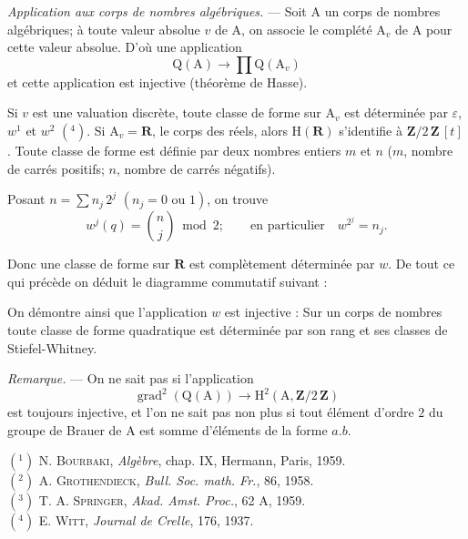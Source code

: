 \emph{Application aux corps de nombres algébriques.} --- Soit $\mathrm A$ un corps de nombres algébriques; à toute valeur absolue $v$ de $\mathrm A$, on associe le complété $\mathrm A_{v}$ de $\mathrm A$ pour cette valeur absolue. D'où une application
\[
\mathrm Q(\mathrm A)\to\prod\mathrm Q(\mathrm A_{v})
\]
et cette application est injective (théorème de Hasse).

Si $v$ est une valuation discrète, toute classe de forme sur $\mathrm A_{v}$ est déterminée par $\varepsilon$, $w^{1}$ et $w^{2}$ $(^{4})$. Si $\mathrm A_{v}=\mathbf R$, le corps des réels, alors $\mathrm H(\mathbf R)$ s'identifie à $\mathbf Z/2\,\mathbf Z\,[t]$. Toute classe de forme est définie par deux nombres entiers $m$ et $n$ ($m$, nombre de carrés positifs; $n$, nombre de carrés négatifs).

Posant $n=\displaystyle\sum n_{j}\,2^{j}$ $(n_{j}=0\text{ ou }1)$, on trouve
\[
w^{j}(q)=\binom{n}{j}\bmod 2;\qquad
\text{en particulier}\quad w^{2^{j}}=n_{j}.
\]

Donc une classe de forme sur $\mathbf R$ est complètement déterminée par $w$. De tout ce qui précède on déduit le diagramme commutatif suivant :

On démontre ainsi que l'application $w$ est injective : Sur un corps de nombres toute classe de forme quadratique est déterminée par son rang et ses classes de Stiefel-Whitney.

\emph{Remarque.} --- On ne sait pas si l'application
\[
\operatorname{grad}^{2}(\mathrm Q(\mathrm A))\to\mathrm H^{2}(\mathrm A,\mathbf Z/2\,\mathbf Z)
\]
est toujours injective, et l'on ne sait pas non plus si tout élément d'ordre $2$ du groupe de Brauer de $\mathrm A$ est somme d'éléments de la forme $a.b$.

{\small
$(^{1})$ N. \textsc{Bourbaki}, \emph{Algèbre}, chap. IX, Hermann, Paris, 1959.\\
$(^{2})$ A. \textsc{Grothendieck}, \emph{Bull. Soc. math. Fr.}, 86, 1958.\\
$(^{3})$ T. A. \textsc{Springer}, \emph{Akad. Amst. Proc.}, 62 A, 1959.\\
$(^{4})$ E. \textsc{Witt}, \emph{Journal de Crelle}, 176, 1937.\par}
